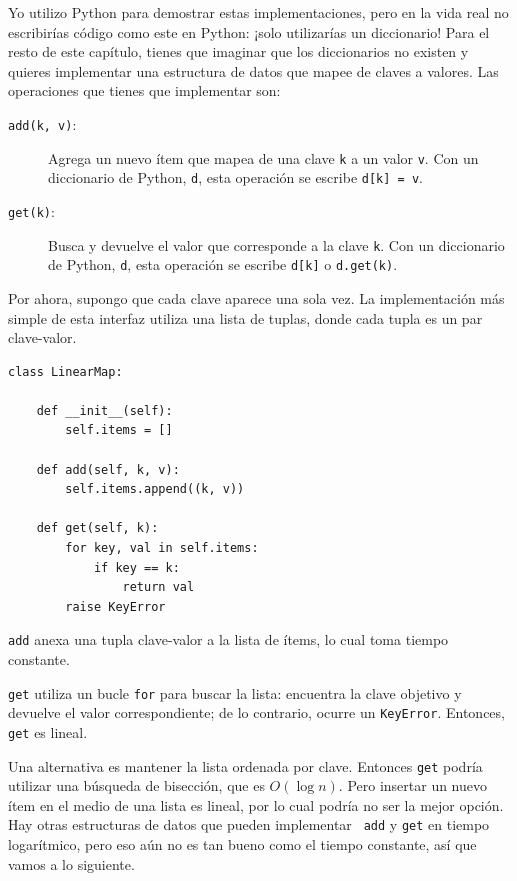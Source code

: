 \documentclass[10pt]{book}
\begin{document}
Yo utilizo Python para demostrar estas implementaciones, pero en la vida
real no escribirías código como este en Python: ¡solo utilizarías un
diccionario!  Para el resto de este capítulo, tienes que imaginar que
los diccionarios no existen y quieres implementar una estructura de datos
que mapee de claves a valores.  Las operaciones que tienes que
implementar son:

\begin{description}

\item[{\tt add(k, v)}:] Agrega un nuevo ítem que mapea de una clave {\tt k}
a un valor {\tt v}.  Con un diccionario de Python, {\tt d}, esta operación
se escribe {\tt d[k] = v}.

\item[{\tt get(k)}:] Busca y devuelve el valor que corresponde
a la clave {\tt k}.  Con un diccionario de Python, {\tt d}, esta operación
se escribe {\tt d[k]} o {\tt d.get(k)}.

\end{description}

Por ahora, supongo que cada clave aparece una sola vez.
La implementación más simple de esta interfaz utiliza una lista de
tuplas, donde cada tupla es un par clave-valor.

\begin{verbatim}
class LinearMap:

    def __init__(self):
        self.items = []

    def add(self, k, v):
        self.items.append((k, v))

    def get(self, k):
        for key, val in self.items:
            if key == k:
                return val
        raise KeyError
\end{verbatim}

{\tt add} anexa una tupla clave-valor a la lista de ítems, lo cual
toma tiempo constante.

{\tt get} utiliza un bucle {\tt for} para buscar la lista:
encuentra la clave objetivo y devuelve el valor correspondiente;
de lo contrario, ocurre un {\tt KeyError}.
Entonces, {\tt get} es lineal.

Una alternativa es mantener la lista ordenada por clave.  Entonces {\tt get}
podría utilizar una búsqueda de bisección, que es $O(\log n)$.  Pero insertar un
nuevo ítem en el medio de una lista es lineal, por lo cual podría no ser la
mejor opción.  Hay otras estructuras de datos que pueden implementar {\tt
  add} y {\tt get} en tiempo logarítmico, pero eso aún no es tan bueno como
el tiempo constante, así que vamos a lo siguiente.
\end{document}
